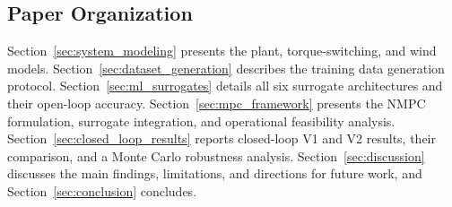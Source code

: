\subsection{Paper Organization}
\label{subsec:organization}

Section~\ref{sec:system_modeling} presents the plant, torque-switching,
and wind models. Section~\ref{sec:dataset_generation} describes the
training data generation protocol. Section~\ref{sec:ml_surrogates}
details all six surrogate architectures and their open-loop accuracy.
Section~\ref{sec:mpc_framework} presents the NMPC formulation, surrogate
integration, and operational feasibility analysis. Section~\ref{sec:closed_loop_results}
reports closed-loop V1 and V2 results, their comparison, and a Monte Carlo
robustness analysis. Section~\ref{sec:discussion} discusses the main
findings, limitations, and directions for future work, and
Section~\ref{sec:conclusion} concludes.
